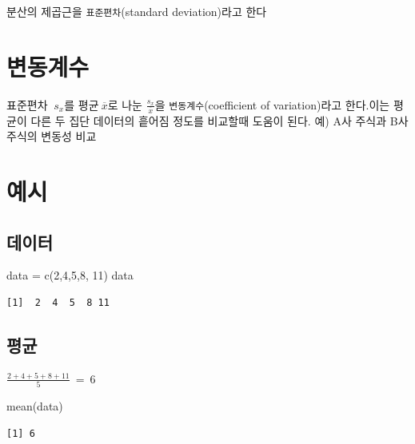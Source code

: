 \documentclass[
  letterpaper,
  DIV=11,
  numbers=noendperiod]{scrreprt}
\newenvironment{Shaded}{\begin{snugshade}}{\end{snugshade}}
\newcommand{\DecValTok}[1]{\textcolor[rgb]{0.68,0.00,0.00}{#1}}
\newcommand{\FunctionTok}[1]{\textcolor[rgb]{0.28,0.35,0.67}{#1}}
\newcommand{\NormalTok}[1]{\textcolor[rgb]{0.00,0.23,0.31}{#1}}
\newcommand{\OtherTok}[1]{\textcolor[rgb]{0.00,0.23,0.31}{#1}}
\begin{document}
분산의 제곱근을 \texttt{표준편차}(standard deviation)라고 한다

\hypertarget{uxbcc0uxb3d9uxacc4uxc218}{%
\section{변동계수}\label{uxbcc0uxb3d9uxacc4uxc218}}

표준편차 \(\ s_x\)를 평균\(\ \overline{x}\)로 나눈
\(\frac{s_x}{\overline{x}}\)을 \texttt{변동계수}(coefficient of
variation)라고 한다.이는 평균이 다른 두 집단 데이터의 흩어짐 정도를
비교할때 도움이 된다. 예) A사 주식과 B사 주식의 변동성 비교

\hypertarget{uxc608uxc2dc-2}{%
\section{예시}\label{uxc608uxc2dc-2}}

\hypertarget{uxb370uxc774uxd130-1}{%
\subsection{데이터}\label{uxb370uxc774uxd130-1}}

\begin{Shaded}
\begin{Highlighting}[]
\NormalTok{data }\OtherTok{=} \FunctionTok{c}\NormalTok{(}\DecValTok{2}\NormalTok{,}\DecValTok{4}\NormalTok{,}\DecValTok{5}\NormalTok{,}\DecValTok{8}\NormalTok{, }\DecValTok{11}\NormalTok{)}
\NormalTok{data}
\end{Highlighting}
\end{Shaded}

\begin{verbatim}
[1]  2  4  5  8 11
\end{verbatim}

\hypertarget{uxd3c9uxade0-1}{%
\subsection{평균}\label{uxd3c9uxade0-1}}

\(\frac{2+4+5+8+11}{5}\ =\ 6\)

\begin{Shaded}
\begin{Highlighting}[]
\FunctionTok{mean}\NormalTok{(data)}
\end{Highlighting}
\end{Shaded}

\begin{verbatim}
[1] 6
\end{verbatim}
\end{document}
